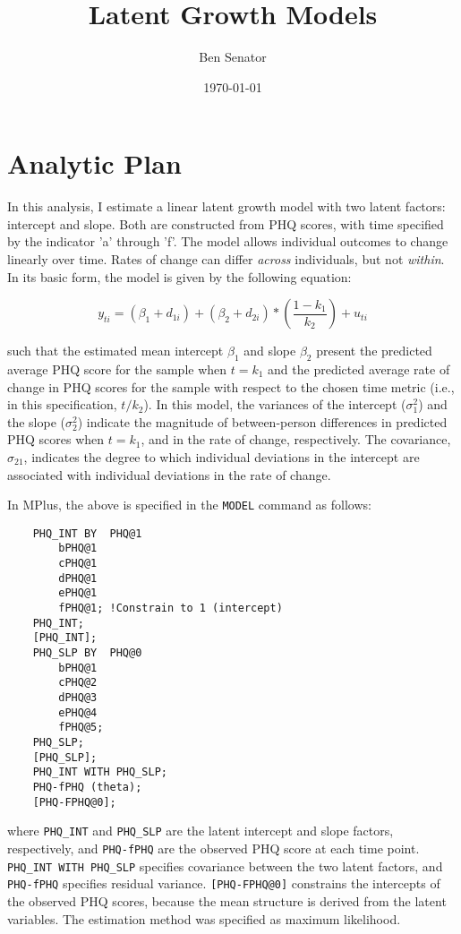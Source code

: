 \documentclass[11pt]{article}
\begin{document}
\title{Latent Growth Models}
\author{Ben Senator}
\date{\today}

\maketitle

\section{Analytic Plan}

In this analysis, I estimate a linear latent growth model with two latent factors: intercept and slope.
Both are constructed from PHQ scores, with time specified by the indicator 'a' through 'f'.
The model allows individual outcomes to change linearly over time.
Rates of change can differ \textit{across} individuals, but not \textit{within}.
In its basic form, the model is given by the following equation:

\[ y_{ti} = (\beta_1 + d_{1i}) + (\beta_2 + d_{2i}) * (\frac{1-k_1}{k_2}) + u_{ti} \]

such that the estimated mean intercept $\beta_1$ and slope $\beta_2$ present the predicted average PHQ score for the sample when $t = k_1$ and the predicted average rate of change in PHQ scores for the sample with respect to the chosen time metric (i.e., in this specification, $t/k_2$).
In this model, the variances of the intercept ($\sigma_1^2$) and the slope ($\sigma_2^2$) indicate the magnitude of between-person differences in predicted PHQ scores when $t = k_1$, and in the rate of change, respectively.
The covariance, $\sigma_{21}$, indicates the degree to which individual deviations in the intercept are associated with individual deviations in the rate of change.

In MPlus, the above is specified in the \texttt{MODEL} command as follows:

\begin{verbatim}
    PHQ_INT BY  PHQ@1
        bPHQ@1
        cPHQ@1
        dPHQ@1
        ePHQ@1
        fPHQ@1; !Constrain to 1 (intercept)
    PHQ_INT;
    [PHQ_INT];
    PHQ_SLP BY  PHQ@0
        bPHQ@1
        cPHQ@2
        dPHQ@3
        ePHQ@4
        fPHQ@5;
    PHQ_SLP;
    [PHQ_SLP];
    PHQ_INT WITH PHQ_SLP;
    PHQ-fPHQ (theta);
    [PHQ-FPHQ@0];
\end{verbatim}

where \texttt{PHQ\_INT} and \texttt{PHQ\_SLP} are the latent intercept and slope factors, respectively, and \texttt{PHQ-fPHQ} are the observed PHQ score at each time point.
\texttt{PHQ\_INT WITH PHQ\_SLP} specifies covariance between the two latent factors, and \texttt{PHQ-fPHQ} specifies residual variance. \texttt{[PHQ-FPHQ@0]} constrains the intercepts of the observed PHQ scores, because the mean structure is derived from the latent variables. The estimation method was specified as maximum likelihood.
\end{document}
